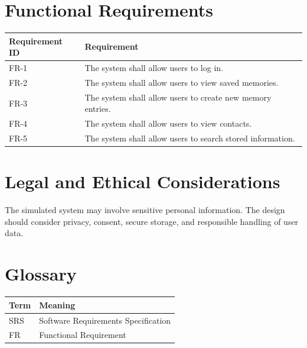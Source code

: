 \documentclass{article}
\begin{document}
\section{Functional Requirements}
\begin{longtable}{|p{3cm}|p{10cm}|}
\hline
Requirement ID & Requirement \\ \hline
FR-1 & The system shall allow users to log in. \\ \hline
FR-2 & The system shall allow users to view saved memories. \\ \hline
FR-3 & The system shall allow users to create new memory entries. \\ \hline
FR-4 & The system shall allow users to view contacts. \\ \hline
FR-5 & The system shall allow users to search stored information. \\ \hline
\end{longtable}

\section{Legal and Ethical Considerations}
The simulated system may involve sensitive personal information. The design should consider privacy, consent, secure storage, and responsible handling of user data.

\section{Glossary}
\begin{longtable}{|p{3cm}|p{10cm}|}
\hline
Term & Meaning \\ \hline
SRS & Software Requirements Specification \\ \hline
FR & Functional Requirement \\ \hline
\end{longtable}
\end{document}
